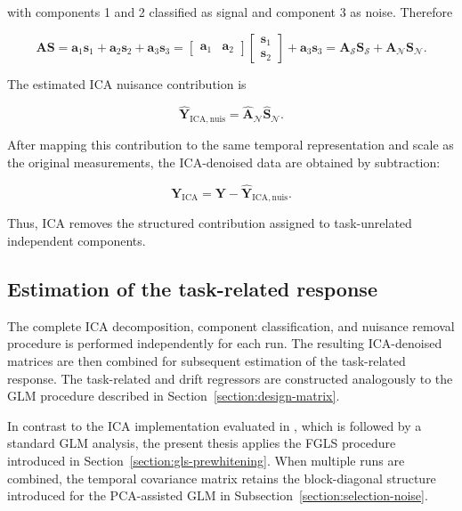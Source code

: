 \documentclass[english]{pwr_wmat_praca_dyplomowa}
\theoremstyle{definition}
\theoremstyle{remark}
\begin{document}
with components 1 and 2 classified as signal and component 3 as noise. Therefore

\begin{equation}
    \mathbf{A}\mathbf{S} 
    = \mathbf{a}_1\mathbf{s}_1 + \mathbf{a}_2\mathbf{s}_2 + \mathbf{a}_3\mathbf{s}_3
    = \begin{bmatrix}\mathbf{a}_1 & \mathbf{a}_2\end{bmatrix} \begin{bmatrix}\mathbf{s}_1 \\ \mathbf{s}_2 \end{bmatrix} + \mathbf{a}_3\mathbf{s}_3
    = \mathbf{A}_{\mathcal{S}}\mathbf{S}_{\mathcal{S}} + \mathbf{A}_{\mathcal{N}}\mathbf{S}_{\mathcal{N}}.
\end{equation}

The estimated ICA nuisance contribution is

\begin{equation}
    \widehat{\mathbf{Y}}_{\mathrm{ICA,nuis}} = \widehat{\mathbf{A}}_{\mathcal{N}} \widehat{\mathbf{S}}_{\mathcal{N}}.
\end{equation}

\newpage
After mapping this contribution to the same temporal representation and scale as the original measurements, the ICA-denoised data are obtained by subtraction:

\begin{equation}
    \mathbf{Y}_{\mathrm{ICA}} = \mathbf{Y} - \widehat{\mathbf{Y}}_{\mathrm{ICA,nuis}}.
\end{equation}

Thus, ICA removes the structured contribution assigned to task-unrelated independent components.

\subsection{Estimation of the task-related response}

The complete ICA decomposition, component classification, and nuisance removal procedure is performed independently for each run. The resulting ICA-denoised matrices are then combined for subsequent estimation of the task-related response. The task-related and drift regressors are constructed analogously to the GLM procedure described in Section~\ref{section:design-matrix}.

In contrast to the ICA implementation evaluated in \cite{glm-denoise}, which is followed by a standard GLM analysis, the present thesis applies the FGLS procedure introduced in Section~\ref{section:gls-prewhitening}. When multiple runs are combined, the temporal covariance matrix retains the block-diagonal structure introduced for the PCA-assisted GLM in Subsection~\ref{section:selection-noise}.
\end{document}
